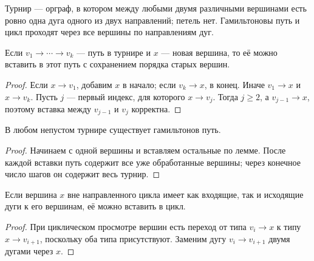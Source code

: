 \begin{definition}[Турнир]
Турнир — орграф, в котором между любыми двумя различными вершинами
есть ровно одна дуга одного из двух направлений; петель нет.
Гамильтоновы путь и цикл проходят через все вершины по направлениям дуг.
\end{definition}
\begin{lemma}
Если \(v_1\to\cdots\to v_k\) — путь в турнире и \(x\) — новая вершина,
то её можно вставить в этот путь с сохранением порядка старых вершин.
\end{lemma}
\begin{proof}
Если \(x\to v_1\), добавим \(x\) в начало; если \(v_k\to x\), в конец.
Иначе \(v_1\to x\) и \(x\to v_k\). Пусть \(j\) — первый индекс,
для которого \(x\to v_j\). Тогда \(j\ge2\), а \(v_{j-1}\to x\),
поэтому вставка между \(v_{j-1}\) и \(v_j\) корректна.
\end{proof}
\begin{theorem}[Редеи]
В любом непустом турнире существует гамильтонов путь.
\end{theorem}
\begin{proof}
Начинаем с одной вершины и вставляем остальные по лемме.
После каждой вставки путь содержит все уже обработанные вершины;
через конечное число шагов он содержит весь турнир.
\end{proof}
\begin{lemma}
Если вершина \(x\) вне направленного цикла имеет как входящие,
так и исходящие дуги к его вершинам, её можно вставить в цикл.
\end{lemma}
\begin{proof}
При циклическом просмотре вершин есть переход от типа
\(v_i\to x\) к типу \(x\to v_{i+1}\), поскольку оба типа присутствуют.
Заменим дугу \(v_i\to v_{i+1}\) двумя дугами через \(x\).
\end{proof}


